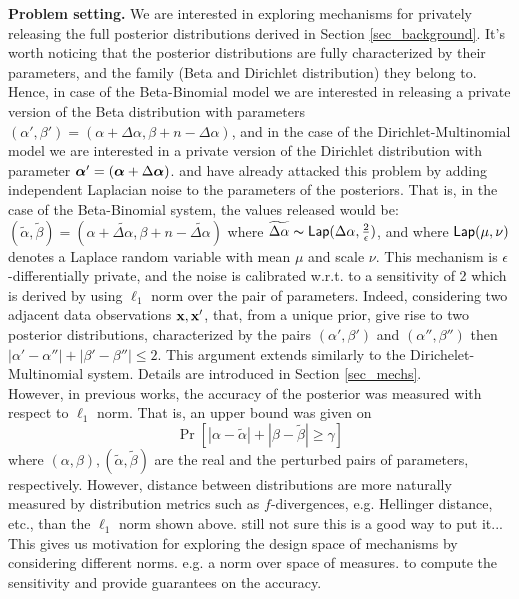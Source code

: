 \documentclass{article}
\begin{document}
\noindent \textbf{Problem setting.}
\label{subsec_problem}
We are interested in exploring mechanisms for privately releasing the full posterior
distributions derived in Section \ref{sec_background}.
It's worth noticing that the posterior distributions are fully characterized
by their parameters, and the family (Beta and Dirichlet distribution) they belong to. Hence, in case of the
Beta-Binomial model we are interested in releasing a private version of the Beta distribution with 
parameters $(\alpha',\beta')=(\alpha + \Delta \alpha,\beta + n - \Delta \alpha)$, and
in the case of the Dirichlet-Multinomial model we are interested in a private version of the Dirichlet distribution with parameter
$\boldsymbol{\alpha}'=(\boldsymbol{\alpha} + \Delta \boldsymbol{\alpha})$. \cite{zhang2016differential} and \cite{xiao2012bayesian}
have already attacked this problem by adding independent Laplacian noise to the
parameters of the posteriors. That is, in the case of the Beta-Binomial system,
the values released would be: $(\tilde\alpha,\tilde\beta)=(\alpha +  \widetilde{\Delta \alpha},\beta + n - \widetilde{\Delta \alpha})$
where $\widetilde{\Delta \alpha}\thicksim \mathsf{Lap}(\Delta \alpha, \frac{2}{\epsilon})$,
and where $\mathsf{Lap}(\mu, \nu)$ denotes a Laplace random variable with mean $\mu$ and scale $\nu$.
This mechanism is $\epsilon$-differentially private, and the noise is
calibrated w.r.t. to a sensitivity of 2 which is derived by using
$\ell_1$ norm over the pair of parameters. Indeed, considering two
adjacent data observations $\textbf{x}, \textbf{x}'$, that, from a unique prior, give rise to two posterior
distributions, characterized by the pairs
$(\alpha',\beta')$ and $(\alpha'',\beta'')$ then
$|\alpha'-\alpha''|+|\beta'-\beta''|\leq 2$.
This argument extends similarly to the Dirichelet-Multinomial system. Details are introduced in Section \ref{sec_mechs}.\\
However, in previous works, the accuracy of the posterior was measured with respect to $\ell_1$ norm. That is, an upper bound was given on
\[
  \Pr[|\alpha - \tilde\alpha| + |\beta - \tilde\beta |\geq \gamma ]
\]
where $(\alpha, \beta), (\tilde\alpha,\tilde\beta)$ are the real and the perturbed pairs of parameters, respectively.
However, distance between
distributions are more naturally  measured by distribution
metrics such as $f$-divergences, e.g. Hellinger distance, etc., than the $\ell_1$ norm shown above.
{\color{blue} still not sure this is a good way to put it...}
This gives us motivation for exploring the design space
of mechanisms by considering different norms. e.g. a norm over space of measures.
to compute the sensitivity and provide guarantees on the accuracy.
\end{document}

